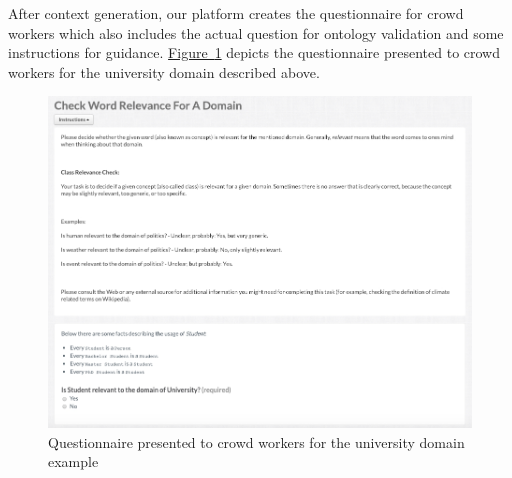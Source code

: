 After context generation, our platform creates the questionnaire for crowd workers which also includes the actual question for ontology validation and some instructions for guidance. 
\hyperref[fig:university_ontology_questionaire]{Figure~\ref*{fig:university_ontology_questionaire}} depicts the questionnaire presented to crowd workers for the university domain described above. 
\begin{figure}
	 \centering
	 \includegraphics[width=\textwidth]{screenshots/questionaire_university_example}
	 \caption{Questionnaire presented to crowd workers for the university domain example}\label{fig:university_ontology_questionaire}
\end{figure}

